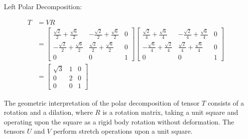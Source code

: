Left Polar Decomposition:

\begin{align*}
T&=VR\\[10pt]
&=\begin{bmatrix}
\frac{\sqrt{ 2 }}{2}+\frac{\sqrt{ 6 }}{2} & -\frac{\sqrt{ 2 }}{2}+\frac{\sqrt{ 6 }}{2} & 0 \\
-\frac{\sqrt{ 2 }}{2}+\frac{\sqrt{ 6 }}{2} & \frac{\sqrt{ 2 }}{2}+\frac{\sqrt{ 6 }}{2} & 0 \\
0 & 0 & 1
\end{bmatrix}\begin{bmatrix}
\frac{\sqrt{ 2 }}{4}+\frac{\sqrt{ 6 }}{4} & -\frac{\sqrt{ 2 }}{4}+\frac{\sqrt{ 6 }}{4} & 0 \\
-\frac{\sqrt{ 6 }}{4}+\frac{\sqrt{ 2 }}{4} & \frac{\sqrt{ 2 }}{4}+\frac{\sqrt{ 6 }}{4} & 0 \\
0 & 0 & 1
\end{bmatrix}\\[10pt]
&=
\begin{bmatrix}
\sqrt{ 3 } & 1 & 0 \\
0 & 2 & 0 \\
0 & 0 & 1
\end{bmatrix}
\end{align*}

The geometric interpretation of the polar decomposition of tensor $T$ consists of a rotation and a dilation, where $R$ is a rotation matrix, taking a unit square and operating upon the square as a rigid body rotation without deformation. The tensors $U$ and $V$ perform stretch operations upon a unit square. 


